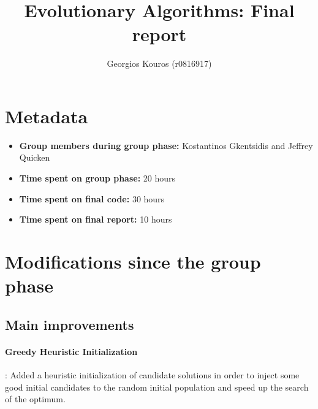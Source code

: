 \documentclass[a4paper,10pt]{article}
\title{Evolutionary Algorithms: Final report}
\author{Georgios Kouros (r0816917)}
\newcommand{\ReplaceMe}[1]{{\color{blue}#1}}
\newcommand{\RemoveMe}[1]{{\color{purple}#1}}
\begin{document}
\selectfont{}

\maketitle

\section{Metadata}

\begin{itemize}
 \item \textbf{Group members during group phase:} Kostantinos Gkentsidis and Jeffrey Quicken
 \item \textbf{Time spent on group phase:} 20 hours
 \item \textbf{Time spent on final code:} 30 hours
 \item \textbf{Time spent on final report:} 10 hours
\end{itemize}

\section{Modifications since the group phase}


\subsection{Main improvements}



\paragraph{Greedy Heuristic Initialization}: Added a heuristic initialization of candidate solutions in order to inject some good initial candidates to the random initial population and speed up the search of the optimum.
\end{document}
